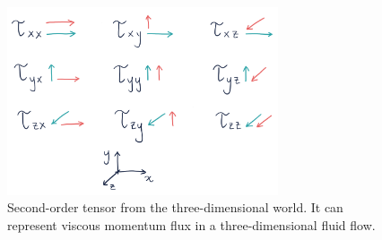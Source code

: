 \documentclass[10pt,twocolumn]{article}
\begin{document}
\begin{figure}[H]
\centering\includegraphics[width=8cm]{tensor-in-matrix-form.png}
\caption{Second-order tensor from the three-dimensional world. It can represent viscous momentum flux in a three-dimensional fluid flow.}
\label{fig:tensor-in-matrix-form}
\end{figure}












\vspace{5mm}


\end{document}
